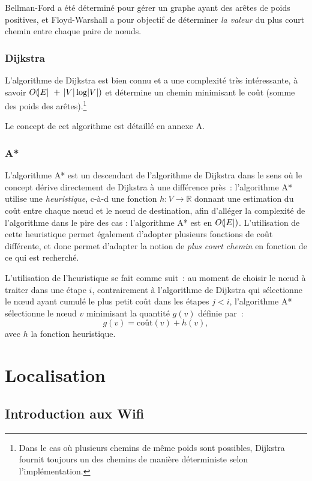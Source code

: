\documentclass[11pt,journal,compsoc]{IEEEtran}
\newcommand{\R}{\mathbb R}
\begin{document}
	Bellman-Ford a été déterminé pour gérer un graphe ayant des arêtes de poids positives, et Floyd-Warshall a pour objectif de déterminer \textit{la valeur}
	du plus court chemin entre chaque paire de nœuds.
    \subsubsection{Dijkstra}
	  L'algorithme de Dijkstra est bien connu et a une complexité très intéressante, à savoir $O(\abs E~+~\abs V\log\abs V)$ et détermine un chemin minimisant
	  le coût (somme des poids des arêtes).\footnote{Dans le cas où plusieurs chemins de même poids sont possibles, Dijkstra fournit toujours un des chemins de
	  manière déterministe selon l'implémentation.}

	  Le concept de cet algorithme est détaillé en annexe A.
    \subsubsection{A*}
	  L'algorithme A* est un descendant de l'algorithme de Dijkstra dans le sens où le concept dérive directement de Dijkstra à une différence près~:
	  l'algorithme A* utilise une \textit{heuristique}, c-à-d une fonction $h : V \to \R$ donnant une estimation du coût entre chaque nœud et le nœud
	  de destination, afin d'alléger la complexité de l'algorithme dans le pire des cas : l'algorithme A* est en $O(\abs E)$. L'utilisation de cette
	  heuristique permet également d'adopter plusieurs fonctions de coût différente, et donc permet d'adapter la notion de \textit{plus court chemin} en fonction
	  de ce qui est recherché.

	  L'utilisation de l'heuristique se fait comme suit~: au moment de choisir le nœud à traiter dans une étape $i$, contrairement à l'algorithme de Dijkstra qui
	  sélectionne le nœud ayant cumulé le plus petit coût dans les étapes $j < i$, l'algorithme A* sélectionne le nœud $v$ minimisant la quantité $g(v)$ définie
	  par~:
	  \begin{equation}
	  	g(v) = \text{coût}(v) + h(v),
	  \end{equation}
	  avec $h$ la fonction heuristique.
\section{Localisation}
  \subsection{Introduction aux Wifi}
\end{document}
